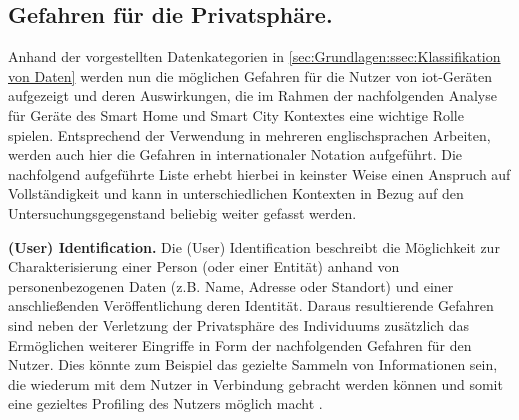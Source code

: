 \subsection{Gefahren für die Privatsphäre.}
\label{sec:Grundlagen:ssec:Gefahren für die Privatsphäre}

Anhand der vorgestellten Datenkategorien in \ref{sec:Grundlagen:ssec:Klassifikation von Daten} werden nun die möglichen Gefahren für die Nutzer von \ac{iot}-Geräten aufgezeigt und deren Auswirkungen, die im Rahmen der nachfolgenden Analyse für Geräte des Smart Home und Smart City Kontextes eine wichtige Rolle spielen. Entsprechend der Verwendung in mehreren englischsprachen Arbeiten, werden auch hier die Gefahren in internationaler Notation aufgeführt. Die nachfolgend aufgeführte Liste erhebt hierbei in keinster Weise einen Anspruch auf Vollständigkeit und kann in unterschiedlichen Kontexten in Bezug auf den Untersuchungsgegenstand beliebig weiter gefasst werden.


\noindent \textbf{(User) Identification.}
Die (User) Identification beschreibt die Möglichkeit zur Charakterisierung einer Person (oder einer Entität) anhand von personenbezogenen Daten (z.B. Name, Adresse oder Standort) und einer anschließenden Veröffentlichung deren Identität. Daraus resultierende Gefahren sind neben der Verletzung der Privatsphäre des Individuums zusätzlich das Ermöglichen weiterer Eingriffe in Form der nachfolgenden Gefahren für den Nutzer. Dies könnte zum Beispiel das gezielte Sammeln von Informationen sein, die wiederum mit dem Nutzer in Verbindung gebracht werden können und somit eine gezieltes Profiling des Nutzers möglich macht \cite{Seliem2018}.



